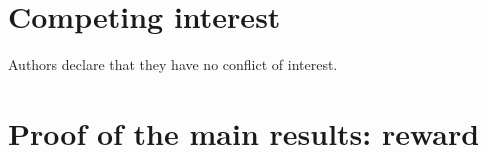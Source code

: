 \documentclass{article}
\begin{document}
\section*{Competing interest} Authors declare that they have no conflict of interest.




\newpage

\appendix
\setcounter{figure}{0}
\setcounter{equation}{0}

\renewcommand*{\thefigure}{A\arabic{figure}}
\renewcommand*{\theequation}{A\arabic{equation}}


\section{Proof of the main results: reward}
\label{sec: appendix1}
\end{document}
